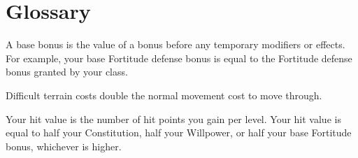 \chapter{Glossary}\label{Glossary}

 A base bonus is the value of a bonus before any temporary modifiers or effects. For example, your base Fortitude defense bonus is equal to the Fortitude defense bonus granted by your class.

 Difficult terrain costs double the normal movement cost to move through.

 Your hit value is the number of hit points you gain per level. Your hit value is equal to half your Constitution, half your Willpower, or half your base Fortitude bonus, whichever is higher.
